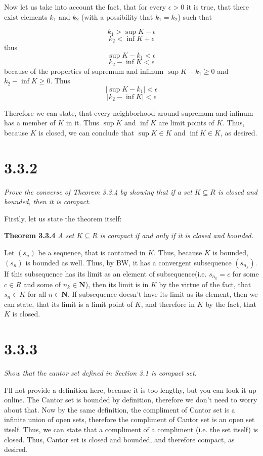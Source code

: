 \documentclass[11pt,oneside,titlepage]{article}
\begin{document}
Now let us take into account the fact, that for every $\epsilon > 0$ it is
true, that there exist elements $k_1$ and $k_2$ (with a possibility
that $k_1 = k_2$) such that

$$k_1 > \sup K - \epsilon$$
$$k_2 < \inf K + \epsilon$$
thus
$$\sup K - k_1 <  \epsilon$$
$$k_2 - \inf K < \epsilon$$
because of the properties of supremum and infinum $\sup K - k_1 \geq  0$ and
$k_2 - \inf K \geq 0$. Thus
$$|\sup K - k_1| < \epsilon$$
$$|k_2 - \inf K| < \epsilon$$

Therefore we can state, that every neighborhood around supremum and infinum
has a member of $K$ in it. Thus $\sup K$ and $\inf  K$ are limit points of $K$.
Thus, because $K$ is closed, we can conclude that $\sup K \in K$ and
$\inf K \in K$, as desired.

\section*{3.3.2}
\textit{Prove the converse of Theorem 3.3.4 by showing that if a set
  $K \subseteq R$ is closed and bounded, then it is compact.}

Firstly, let us state the theorem itself:

\textbf{Theorem 3.3.4}
\textit{A set $K \subseteq R$ is compact if and only if it is closed and
  bounded.}

Let $(s_n)$ be a sequence, that is contained in $K$. Thus, because $K$ is
bounded, $(s_n)$ is bounded as well. Thus, by BW, it has a convergent
subsequence $(s_{n_k})$. If this subsequence has its limit as an
element of subsequence(i.e. $s_{n_k} = c$
for some $c \in R$ and some of $n_k \in  \textbf{N}$),
then its limit is in $K$ by the virtue of the fact, that $s_n \in K$ for
all $n \in \textbf{N}$.
If subsequence doesn't have its limit as its element, then we can state,
that its limit is a limit point of $K$, and therefore in $K$ by the fact, that
$K$ is closed.

\section*{3.3.3}
\textit{Show that the cantor set defined in Section 3.1 is compact set. }

I'll not provide a definition here, because it is too lengthy, but you can
look it up online. The Cantor set is bounded by definition, therefore we don't
need to worry about that. Now by the same definition, 
the compliment of Cantor set is a infinite union of open sets, therefore
the compliment of Cantor set is an open set itself. Thus, we can state
that a compliment of a compliment (i.e. the set itself) is closed. Thus,
Cantor set is closed and bounded, and therefore compact, as desired.
\end{document}

